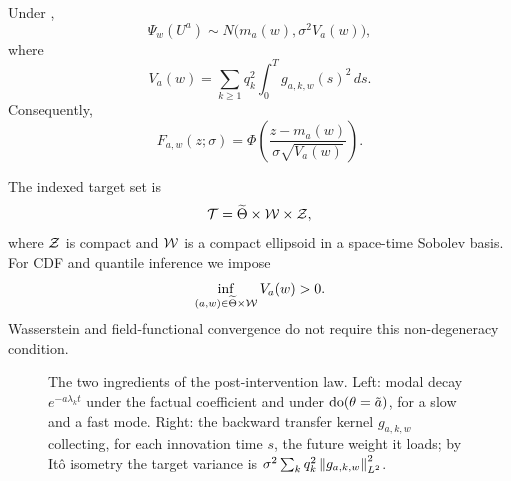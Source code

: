 \begin{proposition}\label{prop:gaussian-law}
Under ,
\[
 \Psi_w(U^a)\sim N\bigl(m_a(w),\sigma^2V_a(w)\bigr),
\]
where
\begin{equation}\label{eq:variance}
 V_a(w)=\sum_{k\ge1}q_k^2\int_0^T g_{a,k,w}(s)^2\,ds.
\end{equation}
Consequently,
\[
 F_{a,w}(z;\sigma)
 =\Phi\left(
 \frac{z-m_a(w)}{\sigma\sqrt{V_a(w)}}
 \right).
\]
\end{proposition}


The indexed target set is
\[
 \mathcal T=\widetilde\Theta\times\mathcal W\times\mathcal Z,
\]
where $\mathcal Z$ is compact and $\mathcal W$ is a compact ellipsoid in a space-time Sobolev basis. For CDF and quantile inference we impose
\[
 \inf_{(a,w)\in\widetilde\Theta\times\mathcal W}V_a(w)>0.
\]
Wasserstein and field-functional convergence do not require this non-degeneracy condition.

\begin{figure}[t]
\centering
\resizebox{.96\textwidth}{!}{}
\caption{The two ingredients of the post-intervention law. Left: modal decay $e^{-a\lambda_kt}$ under the factual coefficient and under $\operatorname{do}(\theta=\tilde a)$, for a slow and a fast mode. Right: the backward transfer kernel $g_{a,k,w}$ collecting, for each innovation time $s$, the future weight it loads; by It\^o isometry the target variance is $\sigma^2\sum_kq_k^2\left\lVert g_{a,k,w}\right\rVert_{L^2}^2$.}
\label{fig:transfer}
\end{figure}
